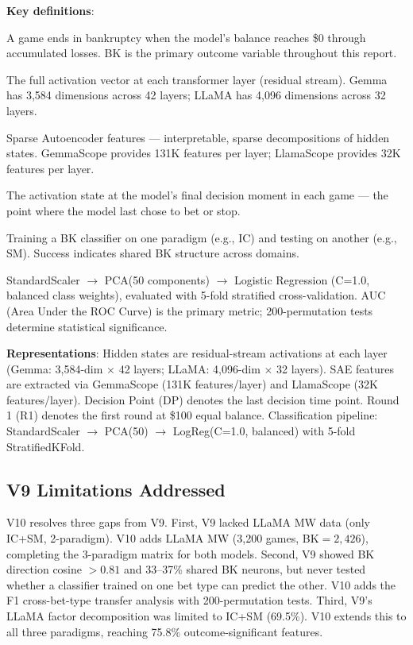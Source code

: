 \documentclass[11pt,a4paper]{article}
\begin{document}
\medskip\noindent\textbf{Key definitions}:
\begin{description}[nosep,leftmargin=1.5em,labelindent=0em]
    \item[Bankruptcy (BK)] A game ends in bankruptcy when the model's balance reaches \$0 through accumulated losses. BK is the primary outcome variable throughout this report.
    \item[Hidden states] The full activation vector at each transformer layer (residual stream). Gemma has 3,584 dimensions across 42 layers; LLaMA has 4,096 dimensions across 32 layers.
    \item[SAE features] Sparse Autoencoder features --- interpretable, sparse decompositions of hidden states. GemmaScope provides 131K features per layer; LlamaScope provides 32K features per layer.
    \item[Decision Point (DP)] The activation state at the model's final decision moment in each game --- the point where the model last chose to bet or stop.
    \item[Cross-domain transfer] Training a BK classifier on one paradigm (e.g., IC) and testing on another (e.g., SM). Success indicates shared BK structure across domains.
    \item[Classification pipeline] StandardScaler $\rightarrow$ PCA(50 components) $\rightarrow$ Logistic Regression (C=1.0, balanced class weights), evaluated with 5-fold stratified cross-validation. AUC (Area Under the ROC Curve) is the primary metric; 200-permutation tests determine statistical significance.
\end{description}

\medskip\noindent\textbf{Representations}: Hidden states are residual-stream activations at each layer (Gemma: 3,584-dim $\times$ 42 layers; LLaMA: 4,096-dim $\times$ 32 layers). SAE features are extracted via GemmaScope (131K features/layer) and LlamaScope (32K features/layer). Decision Point (DP) denotes the last decision time point. Round 1 (R1) denotes the first round at \$100 equal balance. Classification pipeline: StandardScaler $\rightarrow$ PCA(50) $\rightarrow$ LogReg(C=1.0, balanced) with 5-fold StratifiedKFold.

\subsection{V9 Limitations Addressed}

V10 resolves three gaps from V9. First, V9 lacked LLaMA MW data (only IC+SM, 2-paradigm). V10 adds LLaMA MW (3,200 games, BK$=2{,}426$), completing the 3-paradigm matrix for both models. Second, V9 showed BK direction cosine $> 0.81$ and 33--37\% shared BK neurons, but never tested whether a classifier trained on one bet type can predict the other. V10 adds the F1 cross-bet-type transfer analysis with 200-permutation tests. Third, V9's LLaMA factor decomposition was limited to IC+SM (69.5\%). V10 extends this to all three paradigms, reaching 75.8\% outcome-significant features.
\end{document}
